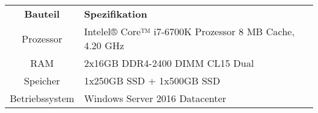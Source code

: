 \begin{tabularx}{\textwidth}{cXX}
    \rowcolor{heading}\textbf{Bauteil} & \textbf{Spezifikation} \\
    Prozessor & Intelel® Core™ i7-6700K Prozessor 8 \ac{MB} Cache, 4.20 \ac{GHz} \\ 
    \rowcolor{odd} \ac{RAM} & 2x16\ac{GB} \ac{DDR4}-2400 \ac{DIMM} \ac{CL}15 Dual \\
    Speicher & 1x250\ac{GB} \ac{SSD} + 1x500\ac{GB} \ac{SSD} \\ 
    \rowcolor{odd} Betriebssystem & Windows Server 2016 Datacenter \\
\end{tabularx}
